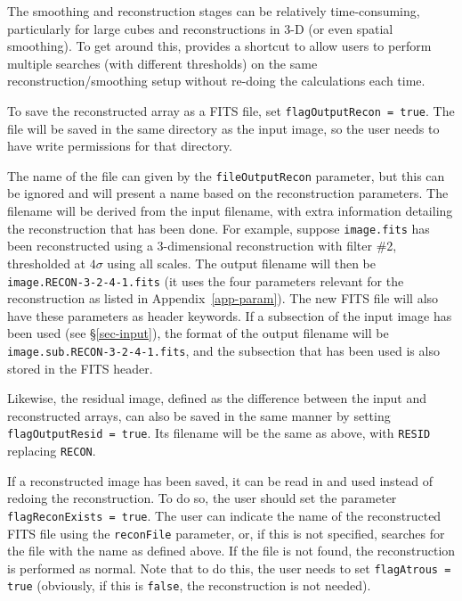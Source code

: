 \label{sec-reconIO}

The smoothing and reconstruction stages can be relatively
time-consuming, particularly for large cubes and reconstructions in
3-D (or even spatial smoothing). To get around this, \duchamp provides
a shortcut to allow users to perform multiple searches (\eg with
different thresholds) on the same reconstruction/smoothing setup
without re-doing the calculations each time.

To save the reconstructed array as a FITS file, set
\texttt{flagOutputRecon = true}. The file will be saved in the same
directory as the input image, so the user needs to have write
permissions for that directory.

The name of the file can given by the \texttt{fileOutputRecon}
parameter, but this can be ignored and \duchamp will present a name
based on the reconstruction parameters. The filename will be derived
from the input filename, with extra information detailing the
reconstruction that has been done. For example, suppose
\texttt{image.fits} has been reconstructed using a 3-dimensional
reconstruction with filter \#2, thresholded at $4\sigma$ using all
scales. The output filename will then be
\texttt{image.RECON-3-2-4-1.fits} (\ie it uses the four parameters
relevant for the \atrous reconstruction as listed in
Appendix~\ref{app-param}). The new FITS file will also have these
parameters as header keywords. If a subsection of the input image has
been used (see \S\ref{sec-input}), the format of the output filename
will be \texttt{image.sub.RECON-3-2-4-1.fits}, and the subsection that
has been used is also stored in the FITS header.

Likewise, the residual image, defined as the difference between the
input and reconstructed arrays, can also be saved in the same manner
by setting \texttt{flagOutputResid = true}. Its filename will be the
same as above, with \texttt{RESID} replacing \texttt{RECON}.

If a reconstructed image has been saved, it can be read in and used
instead of redoing the reconstruction. To do so, the user should set
the parameter \texttt{flagReconExists = true}. The user can indicate
the name of the reconstructed FITS file using the \texttt{reconFile}
parameter, or, if this is not specified, \duchamp searches for the
file with the name as defined above. If the file is not found, the
reconstruction is performed as normal. Note that to do this, the user
needs to set \texttt{flagAtrous = true} (obviously, if this is
\texttt{false}, the reconstruction is not needed).

